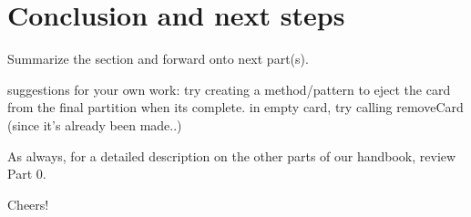 \genHeader
\section{Conclusion and next steps}
\hypertarget{conclusion}{}

Summarize the section and forward onto next part(s).

suggestions for your own work: try creating a method/pattern to eject the card from the final partition when its complete. in empty card, try calling removeCard
(since it's already been made..)

As always, for a detailed description on the other parts of our handbook, review Part 0.

Cheers!